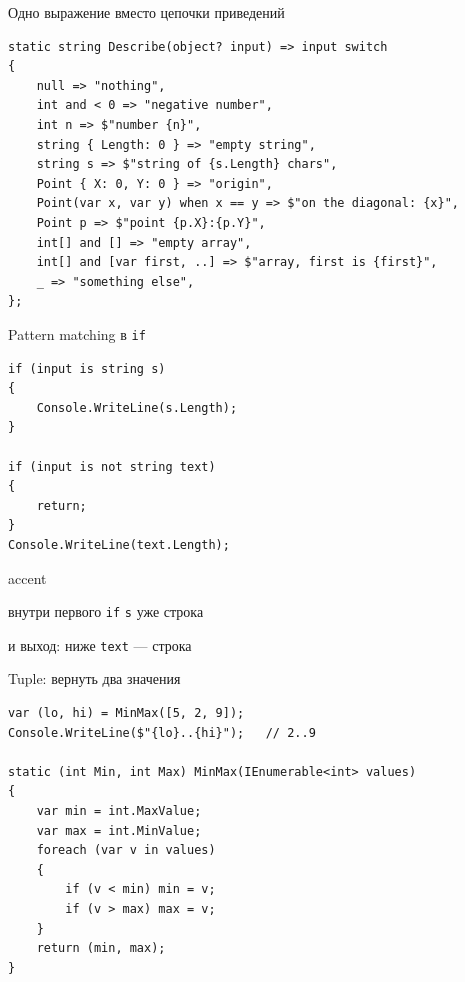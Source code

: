 \documentclass[aspectratio=169,10pt,t]{beamer}
\begin{document}
\begin{frame}[fragile]{Одно выражение вместо цепочки приведений}
  \slidetop
\begin{lstlisting}[style=csharp,basicstyle=\ttfamily\fontsize{7.2}{8.3}\selectfont]
static string Describe(object? input) => input switch
{
    null => "nothing",
    int and < 0 => "negative number",
    int n => $"number {n}",
    string { Length: 0 } => "empty string",
    string s => $"string of {s.Length} chars",
    Point { X: 0, Y: 0 } => "origin",
    Point(var x, var y) when x == y => $"on the diagonal: {x}",
    Point p => $"point {p.X}:{p.Y}",
    int[] and [] => "empty array",
    int[] and [var first, ..] => $"array, first is {first}",
    _ => "something else",
};
\end{lstlisting}
  \vspace{0.3em}
\end{frame}

\begin{frame}[fragile]{Pattern matching в \texttt{if}}
  \slidetop
  \begin{minipage}[t]{0.5\textwidth}
\begin{lstlisting}[style=csharp,basicstyle=\ttfamily\small]
if (input is string s)
{
    Console.WriteLine(s.Length);
}

if (input is not string text)
{
    return;
}
Console.WriteLine(text.Length);
\end{lstlisting}
  \end{minipage}\hfill
  \begin{minipage}[t]{0.44\textwidth}
    \vspace{0.2em}
    \begin{cbul}{accent}
      \item внутри первого \texttt{if} \texttt{s} уже строка
      \item \texttt{} и выход: ниже \texttt{text} --- строка
    \end{cbul}
    \vspace{1.0em}
  \end{minipage}
\end{frame}

\begin{frame}[fragile]{Tuple: вернуть два значения}
  \slidetop
\begin{lstlisting}[style=csharp,basicstyle=\ttfamily\small]
var (lo, hi) = MinMax([5, 2, 9]);
Console.WriteLine($"{lo}..{hi}");   // 2..9

static (int Min, int Max) MinMax(IEnumerable<int> values)
{
    var min = int.MaxValue;
    var max = int.MinValue;
    foreach (var v in values)
    {
        if (v < min) min = v;
        if (v > max) max = v;
    }
    return (min, max);
}
\end{lstlisting}
\end{frame}
\end{document}
